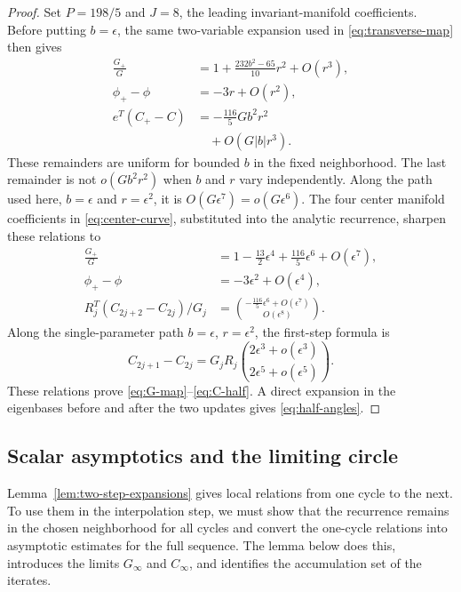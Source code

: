 \documentclass[11pt]{article}
\begin{document}
\begin{proof}
Set $P=198/5$ and $J=8$, the leading invariant-manifold coefficients.  Before
putting $b=\epsilon$, the same two-variable expansion used in
\eqref{eq:transverse-map} then gives
\begin{align*}
\frac{G_+}{G}
&=1+\frac{232b^2-65}{10}r^2+O(r^3),\\
\phi_+-\phi&=-3r+O(r^2),\\
e^T(C_+-C)&=-\frac{116}{5}Gb^2r^2\\
&\quad+O(G|b|r^3).
\end{align*}
These remainders are uniform for bounded $b$ in the fixed neighborhood.  The
last remainder is not $o(Gb^2r^2)$ when $b$ and $r$ vary independently.
Along the path used here,
$b=\epsilon$ and $r=\epsilon^2$, it is
$O(G\epsilon^7)=o(G\epsilon^6)$.
The four center manifold coefficients in \eqref{eq:center-curve}, substituted
into the analytic recurrence, sharpen these relations to
\begin{align*}
\frac{G_+}{G}
&=1-\frac{13}{2}\epsilon^4
+\frac{116}{5}\epsilon^6+O(\epsilon^7),\\
\phi_+-\phi&=-3\epsilon^2+O(\epsilon^4),\\
R_j^T(C_{2j+2}-C_{2j})/G_j
&=\binom{-\frac{116}{5}\epsilon^6+O(\epsilon^7)}
{O(\epsilon^8)}.
\end{align*}
Along the single-parameter path $b=\epsilon$, $r=\epsilon^2$, the first-step
formula is
\[
C_{2j+1}-C_{2j}
=G_jR_j\binom{2\epsilon^3+o(\epsilon^3)}
{2\epsilon^5+o(\epsilon^5)}.
\]
These relations prove \eqref{eq:G-map}--\eqref{eq:C-half}.  A direct expansion
in the eigenbases before and after the two updates gives
\eqref{eq:half-angles}.
\end{proof}

\subsection{Scalar asymptotics and the limiting circle}

Lemma~\ref{lem:two-step-expansions} gives local relations from one cycle to the
next.  To use them in the interpolation step, we must show that the recurrence
remains in the chosen neighborhood for all cycles and convert the one-cycle
relations into asymptotic estimates for the full sequence.  The lemma below
does this, introduces the limits $G_\infty$ and $C_\infty$, and identifies the
accumulation set of the iterates.
\end{document}
